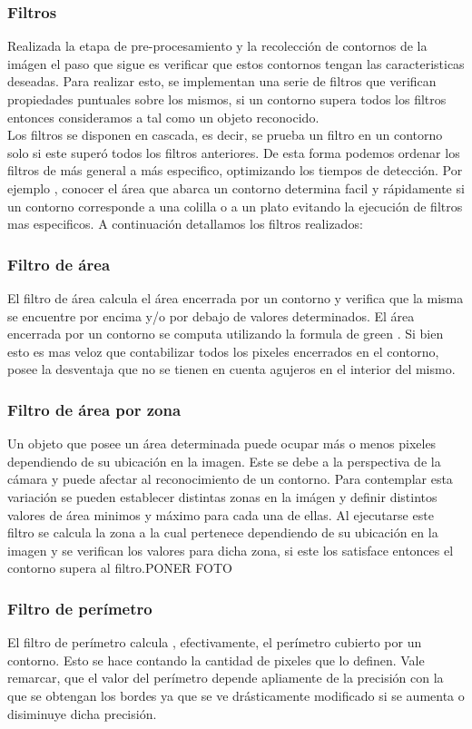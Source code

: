 	\subsubsection{Filtros}
	Realizada la etapa de pre-procesamiento y la recolección de contornos de la imágen el paso que sigue es verificar que estos
	contornos tengan las caracteristicas deseadas. Para realizar esto, se implementan una serie de filtros que verifican propiedades
	puntuales sobre los mismos, si un contorno supera todos los filtros entonces consideramos a tal como un objeto reconocido. \\
	\indent Los filtros se disponen en cascada, es decir, se prueba un filtro en un contorno solo si este superó todos los filtros 
	anteriores. De esta forma podemos ordenar los filtros de más general a más especifico, optimizando los tiempos de detección. Por ejemplo , conocer 
	el área que abarca un contorno determina facil y rápidamente si un contorno corresponde a una colilla o a un plato evitando la ejecución
	de filtros mas especificos. A continuación detallamos los filtros realizados:
	\subsubsection*{Filtro de área}
	El filtro de área calcula el área encerrada por un contorno y verifica que la misma se encuentre por encima y/o por debajo
	de valores determinados. El área encerrada por un contorno se computa utilizando la formula de green \cite{greenwolfram}.
	Si bien esto es mas veloz que contabilizar todos los pixeles encerrados en el contorno, posee la desventaja que no se tienen en cuenta agujeros
	en el interior del mismo.
	\subsubsection*{Filtro de área por zona}
	Un objeto que posee un área determinada puede ocupar más o menos pixeles dependiendo de su ubicación en la imagen. Este se debe a la 
	perspectiva de la cámara y puede afectar al reconocimiento de un contorno. Para contemplar esta variación se pueden establecer distintas
	zonas en la imágen y definir distintos valores de área minimos y máximo para cada una de ellas. Al ejecutarse este filtro se calcula la
	zona a la cual pertenece dependiendo de su ubicación en la imagen y se verifican los valores para dicha zona, si este los satisface entonces
	el contorno supera al filtro.PONER FOTO
	\subsubsection*{Filtro de perímetro}
	El filtro de perímetro calcula , efectivamente, el perímetro cubierto por un contorno. Esto se hace contando la cantidad de pixeles que lo definen.
	Vale remarcar, que el valor del perímetro depende apliamente de la precisión con la que se obtengan los bordes ya que se ve drásticamente modificado 
	si se aumenta o disiminuye dicha precisión.
